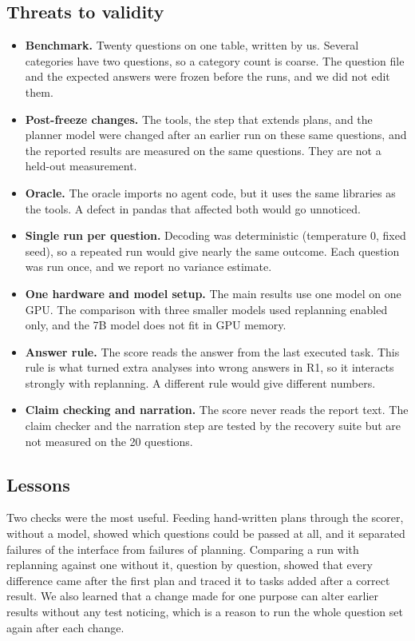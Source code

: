 \subsection{Threats to validity}
\begin{itemize}
\item \textbf{Benchmark.} Twenty questions on one table, written by us. Several categories have two questions, so a category count is coarse. The question file and the expected answers were frozen before the runs, and we did not edit them.
\item \textbf{Post-freeze changes.} The tools, the step that extends plans, and the planner model were changed after an earlier run on these same questions, and the reported results are measured on the same questions. They are not a held-out measurement.
\item \textbf{Oracle.} The oracle imports no agent code, but it uses the same libraries as the tools. A defect in pandas that affected both would go unnoticed.
\item \textbf{Single run per question.} Decoding was deterministic (temperature 0, fixed seed), so a repeated run would give nearly the same outcome. Each question was run once, and we report no variance estimate.
\item \textbf{One hardware and model setup.} The main results use one model on one GPU. The comparison with three smaller models used replanning enabled only, and the 7B model does not fit in GPU memory.
\item \textbf{Answer rule.} The score reads the answer from the last executed task. This rule is what turned extra analyses into wrong answers in R1, so it interacts strongly with replanning. A different rule would give different numbers.
\item \textbf{Claim checking and narration.} The score never reads the report text. The claim checker and the narration step are tested by the recovery suite but are not measured on the 20 questions.
\end{itemize}

\subsection{Lessons}
Two checks were the most useful. Feeding hand-written plans through the scorer, without a model, showed which questions could be passed at all, and it separated failures of the interface from failures of planning. Comparing a run with replanning against one without it, question by question, showed that every difference came after the first plan and traced it to tasks added after a correct result. We also learned that a change made for one purpose can alter earlier results without any test noticing, which is a reason to run the whole question set again after each change.

